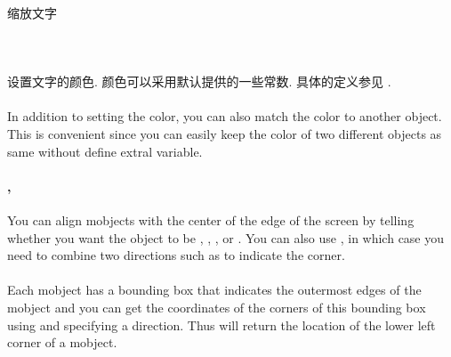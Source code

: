         \paragraph{ \\}
            \hspace*{2em}缩放文字

        \paragraph{ \\}
            \hspace*{2em}设置文字的颜色. 颜色可以采用默认提供的一些常数. 具体的定义参见 . 

        \paragraph{}
        In addition to setting the color, you can also match the color to another object. This is convenient since you can easily keep the color of two different objects as same without define extral variable.

        \paragraph{, }
            \hspace*{2em}You can align mobjects with the center of the edge of the screen by telling  whether you want the object to be , , , or . You can also use , in which case you need to combine two directions such as  to indicate the corner.

        \paragraph{}
            \hspace*{2em}Each mobject has a bounding box that indicates the outermost edges of the mobject and you can get the coordinates of the corners of this bounding box using  and specifying a direction. Thus  will return the location of the lower left corner of a mobject.

